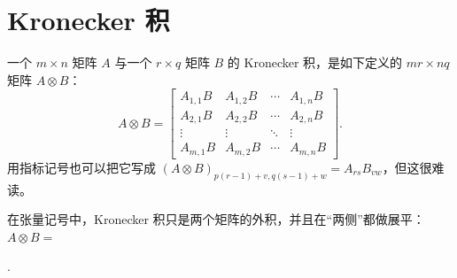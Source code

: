 \section{Kronecker 积}
一个 $m\times n$ 矩阵 $A$ 与一个 $r \times q$ 矩阵 $B$ 的 Kronecker 积，是如下定义的 $mr \times nq$ 矩阵 $A \otimes B$：
\[
   \renewcommand*{\arraystretch}{1.3}
   A \otimes B = \begin{bmatrix}
      A_{1,1} B & A_{1,2} B & \cdots & A_{1,n} B \\
      A_{2,1} B & A_{2,2} B & \cdots & A_{2,n} B \\
      \vdots & \vdots & \ddots & \vdots \\
      A_{m,1} B & A_{m,2} B & \cdots & A_{m,n} B
   \end{bmatrix}
   .
\]
用指标记号也可以把它写成
$(A\otimes B)_{p(r-1)+v, q(s-1)+w} = A_{rs} B_{vw}$，但这很难读。

在张量记号中，Kronecker 积只是两个矩阵的外积，并且在“两侧”都做展平：
$A\otimes B=$
.


